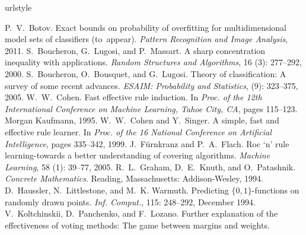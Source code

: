 \documentclass{article}
\renewcommand{\emph}[1]{\textit{#1}}
\begin{document}
\begin{thebibliography}{27}
\providecommand{\natexlab}[1]{#1}
\providecommand{\url}[1]{\texttt{#1}}
\expandafter\ifx\csname urlstyle\endcsname\relax
  \providecommand{\doi}[1]{doi: #1}\else
  \providecommand{\doi}{doi: \begingroup \urlstyle{rm}\Url}\fi

    P.~V.~Botov.
    \newblock Exact bounds on probability of overfitting for multidimensional model sets of classifiers (to~appear).
    \newblock \emph{Pattern Recognition and Image Analysis}, 2011.
    S.~Boucheron, G.~Lugosi, and P.~Massart.
    \newblock A sharp concentration inequality with applications.
    \newblock \emph{Random Structures and Algorithms}, 16 (3): 277--292, 2000.
    S.~Boucheron, O.~Bousquet, and G.~Lugosi.
    \newblock Theory of classification: A survey of some recent advances.
    \newblock \emph{ESAIM: Probability and Statistics},  (9): 323--375, 2005.
    W.~W.~Cohen.
    \newblock Fast effective rule induction.
    \newblock In \emph{Proc. of the 12th International Conference on Machine Learning, Tahoe City, CA}, pages 115--123. Morgan Kaufmann, 1995.
    W.~W.~Cohen and Y.~Singer.
    \newblock A simple, fast and effective rule learner.
    \newblock In \emph{Proc. of the 16 National Conference on Artificial Intelligence}, pages 335--342, 1999.
    J.~F\"urnkranz and P.~A.~Flach.
    \newblock Roc `n' rule learning-towards a better understanding of covering algorithms.
    \newblock \emph{Machine Learning}, 58 (1): 39--77, 2005.
    R.~L.~Graham, D.~E.~Knuth, and O.~Patashnik.
    \newblock \emph{Concrete Mathematics}.
    \newblock Reading, Massachusetts: Addison-Wesley, 1994.
    D.~Haussler, N.~Littlestone, and M.~K. Warmuth.
    \newblock Predicting $\{0,1\}$-functions on randomly drawn points.
    \newblock \emph{Inf. Comput.}, 115: 248--292, December 1994.
    V.~Koltchinskii, D.~Panchenko, and F.~Lozano.
    \newblock Further explanation of the effectiveness of voting methods: {T}he game between margins and weights.

\end{thebibliography}
\end{document}

